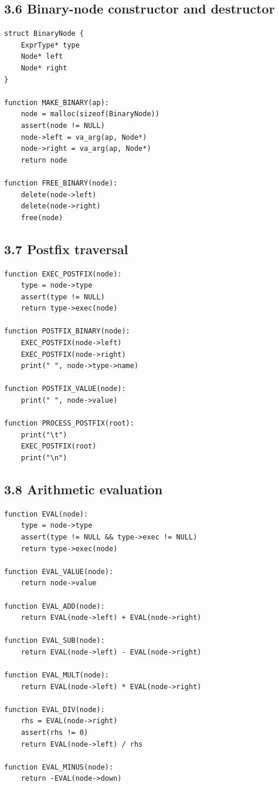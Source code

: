 \documentclass[11pt]{article}
\begin{document}
\subsection{3.6 Binary-node constructor and
destructor}\label{binary-node-constructor-and-destructor}

\begin{verbatim}
struct BinaryNode {
    ExprType* type
    Node* left
    Node* right
}

function MAKE_BINARY(ap):
    node = malloc(sizeof(BinaryNode))
    assert(node != NULL)
    node->left = va_arg(ap, Node*)
    node->right = va_arg(ap, Node*)
    return node

function FREE_BINARY(node):
    delete(node->left)
    delete(node->right)
    free(node)
\end{verbatim}

\subsection{3.7 Postfix traversal}\label{postfix-traversal}

\begin{verbatim}
function EXEC_POSTFIX(node):
    type = node->type
    assert(type != NULL)
    return type->exec(node)

function POSTFIX_BINARY(node):
    EXEC_POSTFIX(node->left)
    EXEC_POSTFIX(node->right)
    print(" ", node->type->name)

function POSTFIX_VALUE(node):
    print(" ", node->value)

function PROCESS_POSTFIX(root):
    print("\t")
    EXEC_POSTFIX(root)
    print("\n")
\end{verbatim}

\subsection{3.8 Arithmetic evaluation}\label{arithmetic-evaluation}

\begin{verbatim}
function EVAL(node):
    type = node->type
    assert(type != NULL && type->exec != NULL)
    return type->exec(node)

function EVAL_VALUE(node):
    return node->value

function EVAL_ADD(node):
    return EVAL(node->left) + EVAL(node->right)

function EVAL_SUB(node):
    return EVAL(node->left) - EVAL(node->right)

function EVAL_MULT(node):
    return EVAL(node->left) * EVAL(node->right)

function EVAL_DIV(node):
    rhs = EVAL(node->right)
    assert(rhs != 0)
    return EVAL(node->left) / rhs

function EVAL_MINUS(node):
    return -EVAL(node->down)
\end{verbatim}
\end{document}
